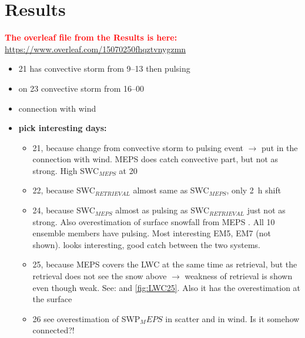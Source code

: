 \chapter{Results} \label{ch:Res}
\textcolor{red}{\textbf{The overleaf file from the Results is here:} \\ \url{https://www.overleaf.com/15070250fhqztvnygzmn}} 
\\
%
%
\begin{itemize}
	\item \SI{21}{\dec} has convective storm from \SIrange{9}{13}{\UTC} then pulsing
	\item on \SI{23}{\dec} convective storm from \SIrange{16}{00}{\UTC} 
	\item connection with wind %
	\item \textbf{pick interesting days:}
	\begin{itemize}
		\item \SI{21}{\dec}, because change from convective storm to pulsing event $\rightarrow$ put in the connection with wind. MEPS does catch convective part, but not as strong. High SWC$_\textit{MEPS}$ at \SI{20}{\UTC}
		\item \SI{22}{\dec}, because SWC$_\mathit{RETRIEVAL}$ almost same as SWC$_\mathit{MEPS}$, only \SI{2}{\hour} shift
		\item \SI{24}{\dec}, because SWC$_\mathit{MEPS}$ almost as pulsing as SWC$_\mathit{RETRIEVAL}$ just not as strong. Also overestimation of surface snowfall from MEPS . All 10 ensemble members have pulsing. Most interesting EM5, EM7 (not shown).
		 looks interesting, good catch between the two systems.
		\item \SI{25}{\dec}, because MEPS covers the LWC at the same time as retrieval, but the retrieval does not see the snow above $\rightarrow$ weakness of retrieval is shown even though weak. See:  and \ref{fig:LWC25}. Also it has the overestimation at the surface 
		\item \SI{26}{\dec}  see overestimation of SWP$_MEPS$ in scatter and in wind. Is it somehow connected?!
	\end{itemize}
\end{itemize}

